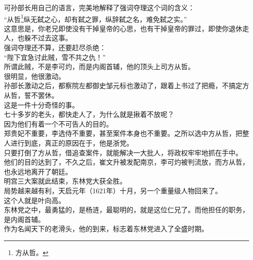 \begin{multicols}{\theparacolNo}
可孙部长用自己的语言，完美地解释了强词夺理这个词的含义：\\

“从哲\footnote{方从哲。}纵无弑之心，却有弑之罪，纵辞弑之名，难免弑之实。”\\

这意思是，你老兄即使没有干掉皇帝的心思，也有干掉皇帝的罪过，即使你退休走人，也躲不过去这事。\\

强词夺理还不算，还要赶尽杀绝：\\

“陛下宜急讨此贼，雪不共之仇！”\\

所谓此贼，不是李可灼，而是内阁首辅，他的顶头上司方从哲。\\

很明显，他很激动。\\

孙部长激动之后，都察院左都御史邹元标也激动了，跟着上书过了把瘾，不搞定方从哲，誓不罢休。\\

这是一件十分奇怪的事。\\

七十多岁的老头，都快走人了，为什么就是揪着不放呢？\\

因为他们有着一个不可告人的目的。\\

郑贵妃不重要，李选侍不重要，甚至案件本身也不重要。之所以选中方从哲，把整人进行到底，真正的原因在于，他是浙党。\\

只要打倒了方从哲，借追查案件，就能解决一大批人，将政权牢牢地抓在手中。\\

他们的目的达到了，不久之后，崔文升被发配南京，李可灼被判流放，而方从哲，也永远地离开了朝廷。\\

明宫三大案就此结束，东林党大获全胜。\\

局势越来越有利，天启元年（1621年）十月，另一个重量级人物回来了。\\

这个人就是叶向高。\\

东林党之中，最勇猛的，是杨涟，最聪明的，就是这位仁兄了。而他担任的职务，是内阁首辅。\\

作为名闻天下的老滑头，他的到来，标志着东林党进入了全盛时期。\\


\end{multicols}
